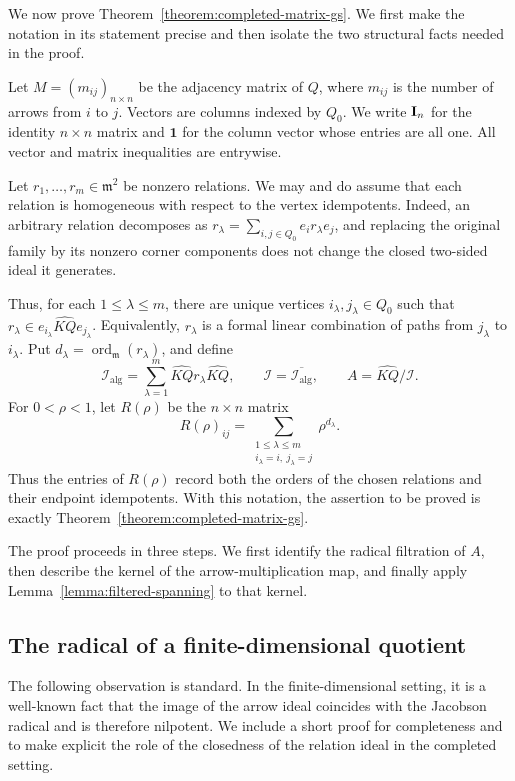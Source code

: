 \documentclass[11pt,letterpaper,reqno]{amsart}
\theoremstyle{definition}
\DeclareMathOperator{\ord}{ord}
\newcommand{\m}{\mathfrak m}
\newcommand{\one}{\mathbf 1}
\newcommand{\widehatKQ}{\widehat{KQ}}
\begin{document}
	We now prove Theorem~\ref{theorem:completed-matrix-gs}.  We first make the notation in its statement precise and then isolate the two structural
	facts needed in the proof.
	
	Let $M=(m_{ij})_{n\times n}$ be the adjacency matrix of $Q$, where
	$m_{ij}$ is the number of arrows from $i$ to $j$.  Vectors are columns
	indexed by $Q_0$.  We write ${\bf I}_{n}$ for the identity $n\times n$ matrix and
	$\one$ for the column vector whose entries are all one.  All vector and
	matrix inequalities are entrywise.
	
	Let $r_1,\ldots,r_m\in\m^2$ be nonzero relations.  We may and do assume that
	each relation is homogeneous with respect to the vertex idempotents.  Indeed,
	an arbitrary relation decomposes as $r_\lambda=\sum_{i,j\in Q_0}e_ir_\lambda e_j$, and replacing the original family by its nonzero corner components does not
	change the closed two-sided ideal it generates.
	
	Thus, for each $1\leq\lambda\leq m$, there are unique vertices $i_\lambda,j_\lambda\in Q_0$ such that $r_\lambda\in e_{i_\lambda}\widehatKQ e_{j_\lambda}$. Equivalently, $r_\lambda$ is a formal linear combination of paths from
	$j_\lambda$ to $i_\lambda$.  Put $d_\lambda=\ord_{\m}(r_\lambda)$, and define
	\[
	\mathcal I_{\mathrm{alg}}
	=\sum_{\lambda=1}^m\widehatKQ r_\lambda\widehatKQ,
	\qquad
	\mathcal I=\overline{\mathcal I_{\mathrm{alg}}},
	\qquad
	A=\widehatKQ/\mathcal I.
	\]
	For $0<\rho<1$, let $R(\rho)$ be the $n\times n$ matrix
	\[
	R(\rho)_{ij}
	=\sum_{\substack{1\leq\lambda\leq m\\
			i_\lambda=i,\ j_\lambda=j}}
	\rho^{d_\lambda}.
	\]
	Thus the entries of $R(\rho)$ record both the orders of the chosen relations
	and their endpoint idempotents.  With this notation, the assertion to be
	proved is exactly Theorem~\ref{theorem:completed-matrix-gs}.
	
	The proof proceeds in three steps.  We first identify the radical filtration
	of $A$, then describe the kernel of the arrow-multiplication map, and finally
	apply Lemma~\ref{lemma:filtered-spanning} to that kernel.
	
	\subsection{The radical of a finite-dimensional quotient}
	
	The following observation is standard.  In the finite-dimensional setting, it is a well-known fact that the image of the arrow ideal coincides with the
	Jacobson radical and is therefore nilpotent.  We include a short proof for
	completeness and to make explicit the role of the closedness of the relation
	ideal in the completed setting.
	
\end{document}
